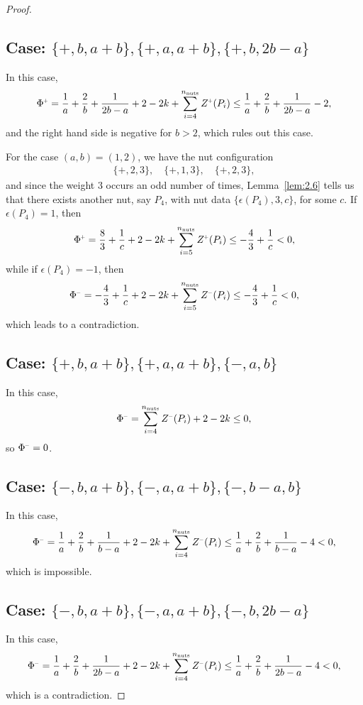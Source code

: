 \documentclass[a4paper,11pt,reqno]{amsart}
\newcommand{\nut}{P}
\theoremstyle{plain}
\newcommand{\nnuts}{n_{\text{\rm nuts}}}
\renewcommand{\P}[1]{{{#1}^{\hspace{-.5pt}\scaleto{+}{4pt}}}}
\newcommand{\M}[1]{{{#1}^{\hspace{-.5pt}\scaleto{-}{4pt}}}}
\numberwithin{equation}{section}
\begin{document}
\begin{proof}
\subsection*{Case: $\{+,b,a+b\}, \{+,a,a+b\},\{+,b,2b-a\}$}
In this case, 
\begin{align}
\P{\Phi}
=\frac{1}{a}+\frac{2}{b}+\frac{1}{2b-a} +2-2k +\sum_{i=4}^{\nnuts}\P{Z}(\nut_i)
\leq\frac{1}{a}+\frac{2}{b}+\frac{1}{2b-a}-2,
\end{align} 
and the right hand side is negative for $b>2$, which rules out this case.

For the case $(a,b)=(1,2)$, we have the nut configuration 
\begin{align} 
\{+,2,3\}, \quad \{+,1,3\}, \quad \{+,2,3\}, 
\end{align} 
and since the weight $3$ occurs an odd number of times, Lemma~\ref{lem:2.6} tells us that there exists another nut, say $\nut_4$, with nut data $\{\epsilon(\nut_4),3,c\}$, for some $c$. If $\epsilon(\nut_4)=1$, then
\begin{align}
\P{\Phi}
=
\frac{8}{3}+\frac{1}{c} +2-2k +\sum_{i=5}^{\nnuts}\P{Z}(\nut_i)
\leq -\frac{4}{3}+\frac{1}{c}
< 0,
\end{align} 
while if $\epsilon(\nut_4)=-1$, then 
\begin{align}
\M{\Phi}
=
-\frac{4}{3}+\frac{1}{c} +2-2k +\sum_{i=5}^{\nnuts}\M{Z}(\nut_i)
\leq -\frac{4}{3}+\frac{1}{c}
< 0,
\end{align}
which leads to a contradiction.

\subsection*{Case: $\{+,b,a+b\},\{+,a,a+b\},\{-,a,b\}$}
In this case, 
\begin{align}
\M{\Phi}
=\sum_{i=4}^{\nnuts}\M{Z}(\nut_i)+2-2k
\leq 0,
\end{align}
so $\M{\Phi} = 0$.

\subsection*{Case: $\{-,b,a+b\},\{-,a,a+b\},\{-,b-a,b\}$}
In this case, 
\begin{align}
\M{\Phi}
=
\frac{1}{a}+\frac{2}{b}+\frac{1}{b-a} +2-2k +\sum_{i=4}^{\nnuts}\M{Z}(\nut_i)
\leq \frac{1}{a}+\frac{2}{b}+\frac{1}{b-a}-4
< 0,
\end{align}
which is impossible.

\subsection*{Case: $\{-,b,a+b\},\{-,a,a+b\},\{-,b,2b-a\}$}
In this case, 
\begin{align}
\M{\Phi}
= \frac{1}{a}+\frac{2}{b}+\frac{1}{2b-a}
+2-2k+\sum_{i=4}^{\nnuts}\M{Z}(\nut_i)
\leq \frac{1}{a}+\frac{2}{b}+\frac{1}{2b-a}-4
<0,
\end{align}
which is a contradiction.


\end{proof}
\end{document}
